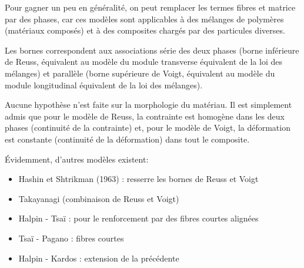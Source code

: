 \medskip
Pour gagner un peu en généralité, on peut remplacer les termes fibres et matrice par des phases,
car ces modèles sont applicables à des mélanges de polymères (matériaux composés)
et à des composites chargés par des particules diverses.

Les bornes correspondent aux associations série des deux phases (borne inférieure de Reuss,
équivalent au modèle  du module transverse équivalent de la loi des mélanges) et parallèle
(borne supérieure de Voigt, équivalent au modèle  du module longitudinal équivalent de la loi des mélanges).

Aucune hypothèse n'est faite sur la morphologie du matériau.
Il est simplement admis que pour le modèle de Reuss, la contrainte est homogène dans les deux
phases (continuité de la contrainte) et, pour le modèle de Voigt,
la déformation est constante  (continuité de la déformation) dans tout le composite.

\medskip
Évidemment, d'autres modèles existent:
\begin{itemize}
	\item Hashin et Shtrikman (1963) : resserre les bornes de Reuss et Voigt
	\item Takayanagi (combinaison de Reuss et Voigt)
	\item Halpin - Tsaï : pour le renforcement par des fibres courtes alignées
	\item Tsaï - Pagano : fibres courtes
	\item Halpin - Kardos : extension de la précédente
\end{itemize}

\medskip
